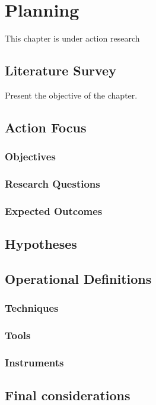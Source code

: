 \chapter{Planning}
\label{chap:plan}

This chapter is under action research 

\section{Literature Survey}

Present the objective of the chapter.

\section{Action Focus}

\subsection{Objectives}

\subsection{Research Questions}

\subsection{Expected Outcomes}

\section{Hypotheses}
\label{sec:planning-hypotheses}

\section{Operational Definitions}
\label{sec:planning-operation}
\subsection{Techniques}
\subsection{Tools}
\subsection{Instruments}

\section{Final considerations} 
